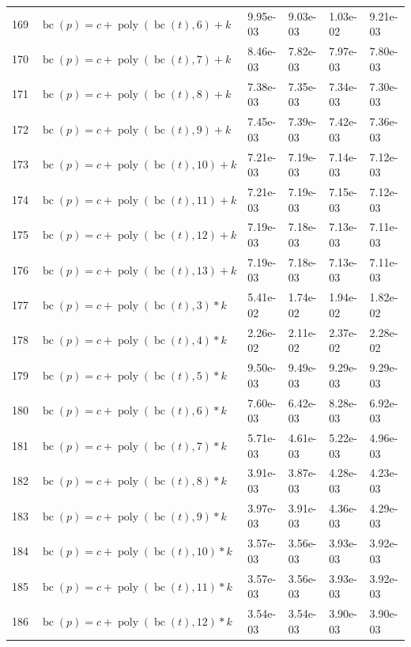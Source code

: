 \documentclass[12pt,a4paper]{article}
\DeclareMathOperator{\bc}{bc}
\DeclareMathOperator{\poly}{poly}
\begin{document}
\begin{longtable}[t]{ll>{\raggedleft\arraybackslash}p{2cm}>{\raggedleft\arraybackslash}p{2cm}>{\raggedleft\arraybackslash}p{2cm}>{\raggedleft\arraybackslash}p{2cm}}
\rowcolor{gray!6}  169 & $\bc(p) = c + \poly\left( \bc(t), 6 \right) + k$ & 9.95e-03 & 9.03e-03 & 1.03e-02 & 9.21e-03\\
170 & $\bc(p) = c + \poly\left( \bc(t), 7 \right) + k$ & 8.46e-03 & 7.82e-03 & 7.97e-03 & 7.80e-03\\
\rowcolor{gray!6}  171 & $\bc(p) = c + \poly\left( \bc(t), 8 \right) + k$ & 7.38e-03 & 7.35e-03 & 7.34e-03 & 7.30e-03\\
172 & $\bc(p) = c + \poly\left( \bc(t), 9 \right) + k$ & 7.45e-03 & 7.39e-03 & 7.42e-03 & 7.36e-03\\
\rowcolor{gray!6}  173 & $\bc(p) = c + \poly\left( \bc(t), 10 \right) + k$ & 7.21e-03 & 7.19e-03 & 7.14e-03 & 7.12e-03\\
174 & $\bc(p) = c + \poly\left( \bc(t), 11 \right) + k$ & 7.21e-03 & 7.19e-03 & 7.15e-03 & 7.12e-03\\
\rowcolor{gray!6}  175 & $\bc(p) = c + \poly\left( \bc(t), 12 \right) + k$ & 7.19e-03 & 7.18e-03 & 7.13e-03 & 7.11e-03\\
176 & $\bc(p) = c + \poly\left( \bc(t), 13 \right) + k$ & 7.19e-03 & 7.18e-03 & 7.13e-03 & 7.11e-03\\
\rowcolor{gray!6}  177 & $\bc(p) = c + \poly\left( \bc(t), 3 \right) * k$ & 5.41e-02 & 1.74e-02 & 1.94e-02 & 1.82e-02\\
178 & $\bc(p) = c + \poly\left( \bc(t), 4 \right) * k$ & 2.26e-02 & 2.11e-02 & 2.37e-02 & 2.28e-02\\
\rowcolor{gray!6}  179 & $\bc(p) = c + \poly\left( \bc(t), 5 \right) * k$ & 9.50e-03 & 9.49e-03 & 9.29e-03 & 9.29e-03\\
180 & $\bc(p) = c + \poly\left( \bc(t), 6 \right) * k$ & 7.60e-03 & 6.42e-03 & 8.28e-03 & 6.92e-03\\
\rowcolor{gray!6}  181 & $\bc(p) = c + \poly\left( \bc(t), 7 \right) * k$ & 5.71e-03 & 4.61e-03 & 5.22e-03 & 4.96e-03\\
182 & $\bc(p) = c + \poly\left( \bc(t), 8 \right) * k$ & 3.91e-03 & 3.87e-03 & 4.28e-03 & 4.23e-03\\
\rowcolor{gray!6}  183 & $\bc(p) = c + \poly\left( \bc(t), 9 \right) * k$ & 3.97e-03 & 3.91e-03 & 4.36e-03 & 4.29e-03\\
184 & $\bc(p) = c + \poly\left( \bc(t), 10 \right) * k$ & 3.57e-03 & 3.56e-03 & 3.93e-03 & 3.92e-03\\
\rowcolor{gray!6}  185 & $\bc(p) = c + \poly\left( \bc(t), 11 \right) * k$ & 3.57e-03 & 3.56e-03 & 3.93e-03 & 3.92e-03\\
186 & $\bc(p) = c + \poly\left( \bc(t), 12 \right) * k$ & 3.54e-03 & 3.54e-03 & 3.90e-03 & 3.90e-03\\

\end{longtable}
\end{document}

